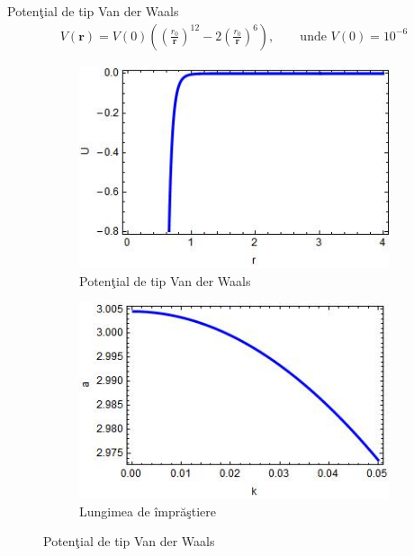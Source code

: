 \begin{frame}[allowframebreaks]{Poten\c{t}ial de tip Van der Waals}
\begin{align}
V({\bm r})=V(0)\left(\left(\frac{r_0}{{\bm r}}\right)^12-2\left(\frac{r_0}{{\bm r}}\right)^6\right), \qquad \text{unde } V(0)=10^{-6}
\end{align}

\begin{figure}[h!]
\centering
\begin{subfigure}{.5\textwidth}
  \centering
  \includegraphics[width=0.9\linewidth]{PotentialVanDerWaals}
  \caption{Poten\c{t}ial de tip Van der Waals}
  \label{fig:sub331}
\end{subfigure}%
\begin{subfigure}{.5\textwidth}
  \centering
  \includegraphics[width=0.9\linewidth]{LungimeImprastiereVanDerWaals}
  \caption{Lungimea de \^{i}mpr\u{a}\c{s}tiere}
  \label{fig:sub332}
\end{subfigure}
\caption{Poten\c{t}ial de tip Van der Waals}
\label{fig:groapa}
\end{figure}
\end{frame}

